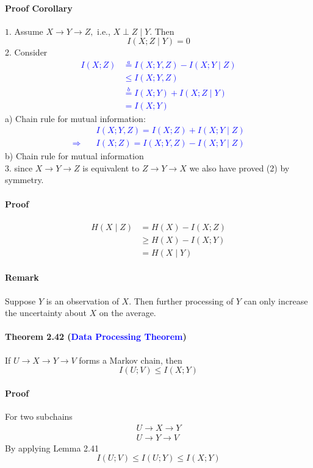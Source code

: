 \documentclass[8pt]{article}
\begin{document}
\paragraph{Proof Corollary}
$1 .$ Assume $X \rightarrow Y \rightarrow Z,$ i.e., $X \perp Z \mid Y$. Then
$$
I(X ; Z \mid Y)=0
$$
2. Consider
\textcolor{blue}{
$$
\begin{aligned}
I(X ; Z) & \stackrel{a}{=} I(X ; Y, Z)-I(X ; Y \mid Z) \\
& \leq I(X ; Y, Z) \\
& \stackrel{b}{=} I(X ; Y)+I(X ; Z \mid Y) \\
&=I(X ; Y)
\end{aligned}
$$
}
a) Chain rule for mutual information:
\textcolor{blue}{
$$
\begin{aligned}
& I(X ; Y, Z)=I(X ; Z)+I(X ; Y \mid Z) \\
\Rightarrow \quad & I(X ; Z)=I(X ; Y, Z)-I(X ; Y \mid Z)
\end{aligned}
$$
}
b) Chain rule for mutual information \\
3. since $X \rightarrow Y \rightarrow Z$ is equivalent to $Z \rightarrow Y \rightarrow X$
we also have proved (2) by symmetry.

\paragraph{Proof}
$$
\begin{aligned}
H(X \mid Z) &=H(X)-I(X ; Z) \\
& \geq H(X)-I(X ; Y) \\
&=H(X \mid Y)
\end{aligned}
$$
\paragraph{Remark} Suppose $Y$ is an observation of $X$. Then further processing of $Y$ can only increase the uncertainty about $X$ on the average.

\begin{tcolorbox}
\paragraph{Theorem 2.42 (\textcolor{blue}{Data Processing Theorem})} If $U \rightarrow X \rightarrow Y \rightarrow V$ forms a Markov chain, then
$$
I(U ; V) \leq I(X ; Y)
$$
\end{tcolorbox}
\paragraph{Proof} For two subchains
$$
\begin{array}{l}
U \rightarrow X \rightarrow Y \\
U \rightarrow Y \rightarrow V
\end{array}
$$
By applying Lemma 2.41
$$
I(U ; V) \leq I(U ; Y) \leq I(X ; Y)
$$
\end{document}
